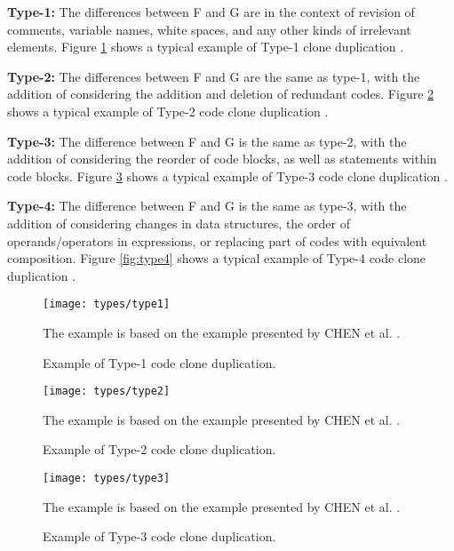 \begin{itemize}
	\begin{item}
		\textbf{Type-1:} The differences between F and G are in the context of revision of comments, variable names,
		white spaces, and any other kinds of irrelevant elements. Figure
		\ref{fig:type1} shows a typical example of Type-1 clone duplication 
		\citep{litreview}. 
	\end{item}
	\begin{item}
		\textbf{Type-2:} The differences between F and G are the same as type-1, with the addition of 
		considering the addition and deletion of redundant codes. Figure
		\ref{fig:type2} shows a typical example of Type-2 code clone duplication  \citep{litreview}. 
	\end{item}
	\begin{item}
		\textbf{Type-3:} The difference between F and G is the same as type-2, with the addition of considering 
		the reorder of code blocks, as well as statements within code blocks. Figure
		\ref{fig:type3} shows a typical example of 
		Type-3 code clone duplication \citep{litreview}. 
	\end{item}
	\begin{item}
		\textbf{Type-4:} The difference between F and G is the same as type-3, with the addition of considering 
		changes in data structures, the order of operands/operators in expressions, or replacing part of codes 
		with equivalent composition. Figure
		\ref{fig:type4} shows a typical example of Type-4 code clone duplication \citep{litreview}. 
	\end{item}

\end{itemize}

\begin{figure}
\texttt{[image: types/type1]}
\caption{Example of Type-1 code clone duplication.}
The example is based on the example presented by CHEN et al. \citep{litreview}. 
\label{fig:type1}
\end{figure}

\begin{figure}
\texttt{[image: types/type2]}
\caption{Example of Type-2 code clone duplication.}
The example is based on the example presented by CHEN et al. \citep{litreview}. 
\label{fig:type2}
\end{figure}

\begin{figure}
\texttt{[image: types/type3]}
\caption{Example of Type-3 code clone duplication.}
The example is based on the example presented by CHEN et al. \citep{litreview}. 
\label{fig:type3}
\end{figure}

